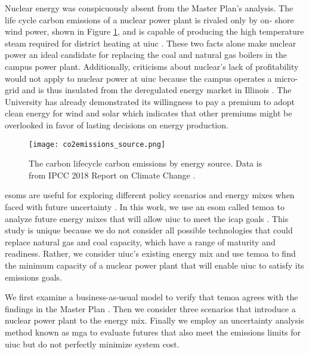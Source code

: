 Nuclear energy was conspicuously absent from the Master Plan's analysis.
The life cycle carbon emissions of a nuclear power plant is rivaled only by on-
shore wind power, shown in Figure \ref{fig:co2sources}, and is capable of
producing the high temperature steam required for district heating at
\gls{uiuc} \cite{allen_framing_2018}. These two facts alone make nuclear power
an ideal candidate for replacing the coal and natural gas boilers in the campus
power plant. Additionally, criticisms about nuclear's lack of profitability
would not apply to nuclear power at \gls{uiuc} because the campus operates a
micro-grid and is thus insulated from the deregulated energy market in
Illinois \cite{clemmer_nuclear_2018, nian_economic_2020}. The University has
already demonstrated its willingness to pay a premium to adopt clean energy for
wind and solar
\cite{breitweiser_wind_2016,white_solar_2017,noauthor_solar_nodate} which
indicates that other premiums might be overlooked in favor of lasting decisions
on energy production.

\begin{figure}[h]
  \centering
  \texttt{[image: co2emissions\_source.png]}
  \caption{The carbon lifecycle carbon emissions by energy source. Data is from
  IPCC 2018 Report on Climate Change \cite{allen_framing_2018}.}
  \label{fig:co2sources}
\end{figure}

 \glspl{esom} are useful for
exploring different policy scenarios and energy mixes when faced with future
uncertainty
\cite{decarolis_modelling_2016,hunter_modeling_2013,li_open_2020,decarolis_multi-stage_nodate}.
In this work, we use an \gls{esom} called \gls{temoa}
to analyze future energy mixes that will allow \gls{uiuc} to meet the
\gls{icap} goals \cite{decarolis_tools_2020}. This study is unique because we do
not consider all possible technologies that could replace natural gas and coal
capacity, which have a range of maturity and readiness. Rather, we
consider \gls{uiuc}'s existing energy mix and use \gls{temoa} to find the
minimum capacity of a nuclear power plant that will enable \gls{uiuc} to
satisfy its emissions goals.

We first examine a business-as-usual model to verify that \gls{temoa} agrees
with the findings in the Master Plan
\cite{affiliated_engineers_inc_utilities_2015}. Then we consider three scenarios
that introduce a nuclear power plant to the energy mix. Finally we employ an
uncertainty analysis method known as \gls{mga} to evaluate futures
that also meet the emissions limits for \gls{uiuc} but do not perfectly
minimize system cost.
